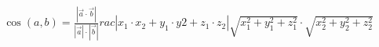 \documentclass[preview]{standalone}
\begin{document}
\begin{align*}
\cos(a,b) = \frac{|\vec{a} \cdot \vec{b}|}{|\vec{a}|\cdot|\vec{b}|}rac{|x_1 \cdot x_2 + y_1 \cdot y2 + z_1 \cdot z_2|}{\sqrt{x_1^2 + y_1^2 + z_1^2} \cdot \sqrt{x_2^2 + y_2^2 + z_2^2}}
\end{align*}
\end{document}
